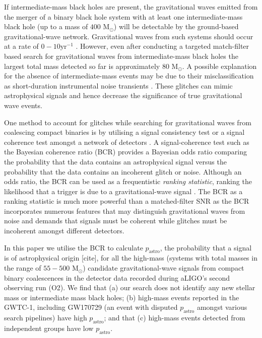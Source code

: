 \documentclass[%
 reprint,
 amsmath,amssymb,
 aps,
]{revtex4}
\newcommand{\bcr}{{\sc BCR}\xspace}
\newcommand{\pastro}{{$p_\text{astro}$}\xspace}
\newcommand{\msun}{{M${}_\odot$}\xspace}
\begin{document}
If intermediate-mass black holes are present, the gravitational waves emitted from the merger of a binary black hole system with at least one intermediate-mass black hole (up to a mass of $400$ \msun) will be detectable by the ground-based gravitational-wave network. Gravitational waves from such systems should occur at a rate of $0-10\text{yr}^{-1}$ \cite{fregeau2006imbhbRatePrediction, mandel2008rates,rodriguez2015bbhRatePredictions}.  However, even after conducting a targeted match-filter based search for gravitational waves from intermediate-mass black holes the largest total mass detected so far is approximately $80$ \msun \cite{salemi2019search, abbott2019gwtc}. A possible explanation for the absence of intermediate-mass events may be due to their misclassification as short-duration instrumental noise transients \cite{blip_glitches}. These glitches can mimic astrophysical signals and hence decrease the significance of true gravitational wave events. 

One method to account for glitches while searching for gravitational waves from coalescing compact binaries is by utilising a signal consistency test \cite{pycbc_short_duration_transients} or a signal coherence test amongst a network of detectors \cite{bci, bcr_paper,  bcr_gw151216, bayesian_odds}. A signal-coherence test such as the Bayesian coherence ratio (\bcr) \cite{bcr_paper} provides a Bayesian odds ratio comparing the probability that the data contains an astrophysical signal versus the probability that the data contains an incoherent glitch or noise. Although an odds ratio, the \bcr can be used  as a frequentistic \textit{ranking statistic}, ranking the likelihood that a trigger is due to a gravitational-wave signal \cite{bcr_paper}. The \bcr as a ranking statistic is much more powerful than a matched-filter SNR as the \bcr incorporates numerous features that may distinguish gravitational waves from noise and demands that signals must be coherent while glitches must be incoherent amongst different detectors. 

In this paper we utilise the \bcr to calculate \pastro, the probability that a signal is of astrophysical origin [cite],  for all the high-mass (systems with total masses in the range of $55-500$ \msun) candidate gravitational-wave signals from compact binary coalescences in the detector data recorded during aLIGO's second observing run (O2).  We find that (a) our search does not identify any new stellar mass or intermediate mass black holes; (b) high-mass events reported in the GWTC-1, including GW170729 (an event with disputed $p_\text{astro}$ amongst various search pipelines) have high \pastro; and that (c) high-mass events detected from independent groups have low \pastro. 
\end{document}
